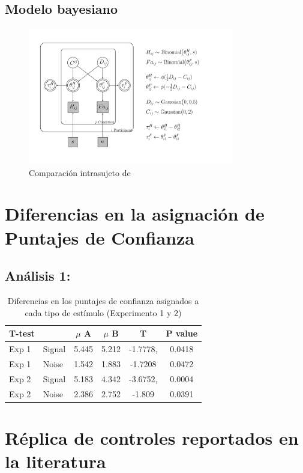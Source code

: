 \subsection{Modelo bayesiano}


\begin{figure}[th]
\centering
\includegraphics[width=0.80\textwidth]{Figures/Model_Tau_Diff_Tetas}
\caption[Diferencias en Tasas (Comprobando diferencias entre condiciones)]{Comparación intrasujeto de}
\label{fig:Mod_Tau}
\end{figure}




\section{Diferencias en la asignación de Puntajes de Confianza}

\subsection{Análisis 1: }

\begin{table}
\caption[Prueba T]{Diferencias en los puntajes de confianza asignados a cada tipo de estímulo (Experimento 1 y 2)}
\label{Tabla_t-HitsyFA}
\centering
\begin{tabular}{l l |  c c c c}
\toprule
\textbf{T-test} & \textbf{} & \textbf{$\mu$ A} & \textbf{$\mu$ B} & \textbf{T} & \textbf{P value}\\
\midrule
Exp 1 & Signal & 5.445 & 5.212 & -1.7778, & 0.0418 \\
Exp 1 & Noise & 1.542 & 1.883 & -1.7208 & 0.0472 \\
Exp 2 & Signal & 5.183 & 4.342  & -3.6752, & 0.0004 \\
Exp 2 & Noise & 2.386 & 2.752 & -1.809 & 0.0391 \\
\bottomrule
\end{tabular}
\end{table}



\section{Réplica de controles reportados en la literatura}



